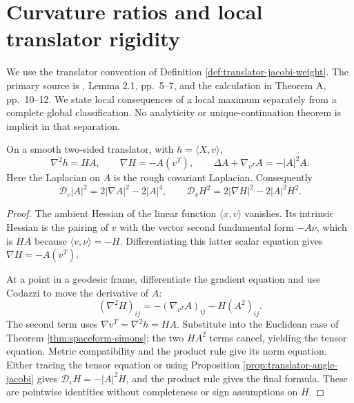 \chapter{Curvature ratios and local translator rigidity}\label{sec:translator-curvature-rigidity}
We use the translator convention of Definition \ref{def:translator-jacobi-weight}. The primary source is \cite{MSHS14}, Lemma 2.1, pp.~5--7, and the calculation in Theorem A, pp.~10--12. We state local consequences of a local maximum separately from a complete global classification. No analyticity or unique-continuation theorem is implicit in that separation.

\begin{proposition}\label{prop:translator-tensor-simons}
On a smooth two-sided translator, with $h=\langle X,v\rangle$,
\[
 \nabla^2h=HA,\qquad \nabla H=-A(v^T),\qquad
 \Delta A+\nabla_{v^T}A=-|A|^2A.
\]
Here the Laplacian on $A$ is the rough covariant Laplacian. Consequently
\[
 \mathcal D_v|A|^2=2|\nabla A|^2-2|A|^4,
 \qquad \mathcal D_vH^2=2|\nabla H|^2-2|A|^2H^2.
\]
\end{proposition}
\begin{proof}
The ambient Hessian of the linear function $\langle x,v\rangle$ vanishes. Its intrinsic Hessian is the pairing of $v$ with the vector second fundamental form $-A\nu$, which is $HA$ because $\langle v,\nu\rangle=-H$. Differentiating this latter scalar equation gives $\nabla H=-A(v^T)$.

At a point in a geodesic frame, differentiate the gradient equation and use Codazzi to move the derivative of $A$:
\[
 (\nabla^2H)_{ij}=-(\nabla_{v^T}A)_{ij}-H(A^2)_{ij}.
\]
The second term uses $\nabla v^T=\nabla^2h=HA$. Substitute into the Euclidean case of Theorem \ref{thm:spaceform-simons}; the two $HA^2$ terms cancel, yielding the tensor equation. Metric compatibility and the product rule give its norm equation. Either tracing the tensor equation or using Proposition \ref{prop:translator-angle-jacobi} gives $\mathcal D_vH=-|A|^2H$, and the product rule gives the final formula. These are pointwise identities without completeness or sign assumptions on $H$.
\end{proof}

